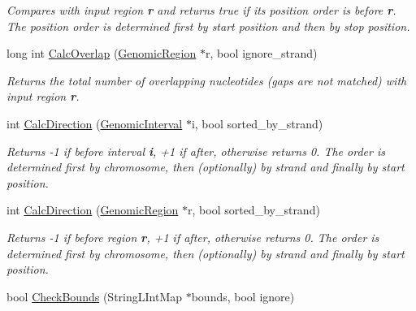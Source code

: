 \begin{CompactItemize}
\begin{CompactList}\small\item\em Compares with input region {\bf r} and returns true if its position order is before {\bf r}. The position order is determined first by start position and then by stop position. \item\end{CompactList}\item 
\hypertarget{classGenomicRegion_623e28aab180174d43873c4a85342ad4}{
long int \hyperlink{classGenomicRegion_623e28aab180174d43873c4a85342ad4}{CalcOverlap} (\hyperlink{classGenomicRegion}{GenomicRegion} $\ast$r, bool ignore\_\-strand)}
\label{classGenomicRegion_623e28aab180174d43873c4a85342ad4}

\begin{CompactList}\small\item\em Returns the total number of overlapping nucleotides (gaps are not matched) with input region {\bf r}. \item\end{CompactList}\item 
\hypertarget{classGenomicRegion_da548684fc4ae44dd3782aa15eaaf0a8}{
int \hyperlink{classGenomicRegion_da548684fc4ae44dd3782aa15eaaf0a8}{CalcDirection} (\hyperlink{classGenomicInterval}{GenomicInterval} $\ast$i, bool sorted\_\-by\_\-strand)}
\label{classGenomicRegion_da548684fc4ae44dd3782aa15eaaf0a8}

\begin{CompactList}\small\item\em Returns -1 if before interval {\bf i}, +1 if after, otherwise returns 0. The order is determined first by chromosome, then (optionally) by strand and finally by start position. \item\end{CompactList}\item 
\hypertarget{classGenomicRegion_b44366e44dc9a83da65b9593ce90dd32}{
int \hyperlink{classGenomicRegion_b44366e44dc9a83da65b9593ce90dd32}{CalcDirection} (\hyperlink{classGenomicRegion}{GenomicRegion} $\ast$r, bool sorted\_\-by\_\-strand)}
\label{classGenomicRegion_b44366e44dc9a83da65b9593ce90dd32}

\begin{CompactList}\small\item\em Returns -1 if before region {\bf r}, +1 if after, otherwise returns 0. The order is determined first by chromosome, then (optionally) by strand and finally by start position. \item\end{CompactList}\item 
\hypertarget{classGenomicRegion_2a99aedb0632fd7e1f2f8dc995ba9191}{
bool \hyperlink{classGenomicRegion_2a99aedb0632fd7e1f2f8dc995ba9191}{CheckBounds} (StringLIntMap $\ast$bounds, bool ignore)}
\label{classGenomicRegion_2a99aedb0632fd7e1f2f8dc995ba9191}


\end{CompactItemize}
